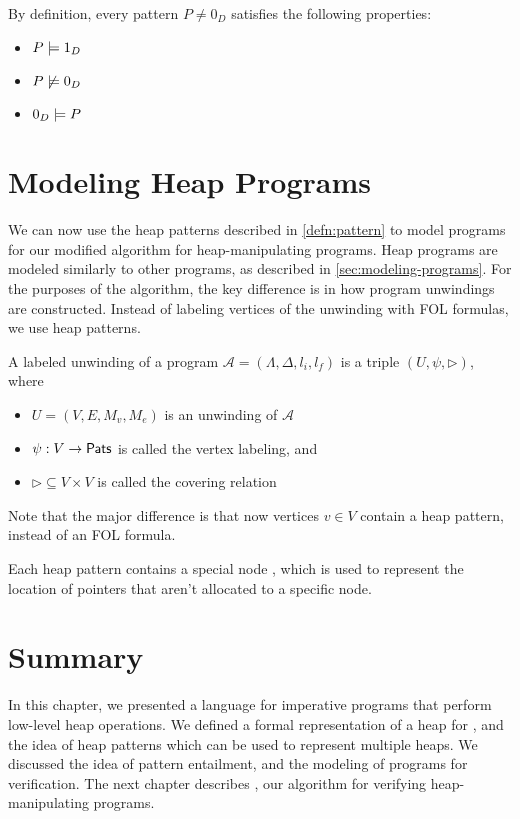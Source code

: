 By definition, every pattern $P \neq 0_D$ satisfies the following properties:
\begin{itemize}
  \item $P \models 1_D$
  \item $P \not \models 0_D$
  \item $0_D \models P$
\end{itemize}

\section{Modeling Heap Programs}
\label{sec:modeling-heap-programs}

We can now use the heap patterns described in \autoref{defn:pattern} to model programs for our modified \impact algorithm for heap-manipulating programs. Heap programs are modeled similarly to other programs, as described in \autoref{sec:modeling-programs}. For the purposes of the \impact algorithm, the key difference is in how program unwindings are constructed. Instead of labeling vertices of the unwinding with FOL formulas, we use heap patterns.

\begin{defn}
  \label{defn:labeled-heap-prog-unwinding}
  A labeled unwinding of a program $\mathcal{A} = (\Lambda, \Delta, l_i, l_f)$ is a triple $(U, \psi, \rhd)$, where

  \begin{itemize}
    \item $U = (V, E, M_v, M_e)$ is an unwinding of $\mathcal{A}$
    \item $\psi : V \to \mathsf{Pats}$ is called the vertex labeling, and
    \item $\rhd \subseteq V \times V$ is called the covering relation
  \end{itemize}

  Note that the major difference is that now vertices $v \in V$ contain a heap pattern, instead of an FOL formula.
\end{defn}

Each heap pattern contains a special node \nilconst, which is used to represent the location of pointers that aren't allocated to a specific node.

\section*{Summary}
In this chapter, we presented a language \lang for imperative programs that perform low-level heap operations. We defined a formal representation of a heap for \lang, and the idea of heap patterns which can be used to represent multiple heaps. We discussed the idea of pattern entailment, and the modeling of \lang programs for verification. The next chapter describes \verifier, our algorithm for verifying heap-manipulating programs.